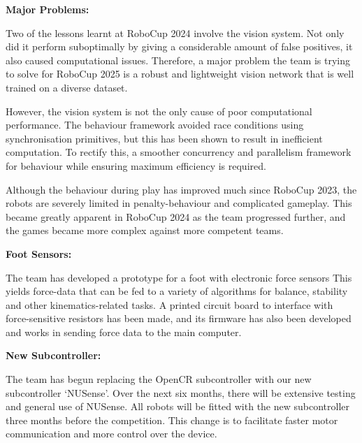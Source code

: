 \documentclass{llncs}
\begin{document}

\noindent\textbf{Major Problems:}

Two of the lessons learnt at RoboCup 2024 involve the vision system. Not only did it perform suboptimally by giving a considerable amount of false positives, it also caused computational issues. Therefore, a major problem the team is trying to solve for RoboCup 2025 is a robust and lightweight vision network that is well trained on a diverse dataset. 

However, the vision system is not the only cause of poor computational performance. The behaviour framework avoided race conditions using synchronisation primitives, but this has been shown to result in inefficient computation. To rectify this, a smoother concurrency and parallelism framework for behaviour while ensuring maximum efficiency is required.

Although the behaviour during play has improved much since RoboCup 2023, the robots are severely limited in penalty-behaviour and complicated gameplay. This became greatly apparent in RoboCup 2024 as the team progressed further, and the games became more complex against more competent teams. \newline

\noindent\textbf{Foot Sensors:}

The team has developed a prototype for a foot with electronic force sensors This yields force-data that can be fed to a variety of algorithms for balance, stability and other kinematics-related tasks. A printed circuit board to interface with force-sensitive resistors has been made, and its firmware has also been developed and works in sending force data to the main computer. \newline

\noindent\textbf{New Subcontroller:}

The team has begun replacing the OpenCR subcontroller with our new subcontroller `NUSense'. Over the next six months, there will be extensive testing and general use of NUSense. All robots will be fitted with the new subcontroller three months before the competition. This change is to facilitate faster motor communication and more control over the device.\newline
\end{document}
